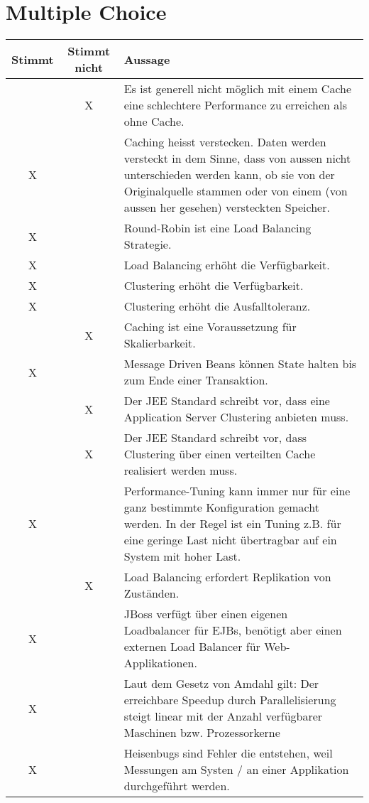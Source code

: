 \documentclass[a4paper,10pt]{scrreprt}
\begin{document}
\section{Multiple Choice} %
\label{sec:multiple_choice}
\begin{tabular}{|c|c|p{12cm}|}
\hline
Stimmt & Stimmt nicht & Aussage \\ \hline
& X & Es ist generell nicht möglich mit einem Cache eine schlechtere Performance zu erreichen als
ohne Cache.\\ \hline
X & & Caching heisst verstecken. Daten werden versteckt in dem Sinne, dass von aussen nicht
unterschieden werden kann, ob sie von der Originalquelle stammen oder von einem (von aussen
her gesehen) versteckten Speicher.\\ \hline
X & & Round-Robin ist eine Load Balancing Strategie.\\ \hline
X & & Load Balancing erhöht die Verfügbarkeit.\\ \hline
X & &Clustering erhöht die Verfügbarkeit.\\ \hline
X & & Clustering erhöht die Ausfalltoleranz.\\ \hline
& X & Caching ist eine Voraussetzung für Skalierbarkeit.\\ \hline
X & & Message Driven Beans können State halten bis zum Ende einer Transaktion.\\ \hline
&X& Der JEE Standard schreibt vor, dass eine Application Server Clustering anbieten muss.\\ \hline
& X & Der JEE Standard schreibt vor, dass Clustering über einen verteilten Cache realisiert werden
muss.\\ \hline
X & & Performance-Tuning kann immer nur für eine ganz bestimmte Konfiguration gemacht werden. In
der Regel ist ein Tuning z.B. für eine geringe Last nicht übertragbar auf ein System mit hoher
Last. \\ \hline
& X & Load Balancing erfordert Replikation von Zuständen.\\ \hline
X & & JBoss verfügt über einen eigenen Loadbalancer für EJBs, benötigt aber einen externen Load
Balancer für Web-Applikationen. \\ \hline
X & & Laut dem Gesetz von Amdahl gilt: Der erreichbare Speedup durch Parallelisierung steigt linear
mit der Anzahl verfügbarer Maschinen bzw. Prozessorkerne\\ \hline
X & & Heisenbugs sind Fehler die entstehen, weil Messungen am Systen / an einer Applikation
durchgeführt werden.\\

\end{tabular}
\end{document}

